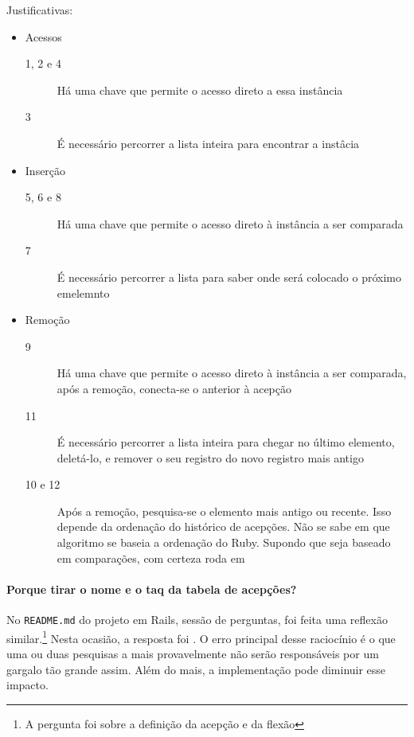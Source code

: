 Justificativas:
\begin{itemize}
    \item Acessos
    \begin{description}
        \item[1, 2 e 4] Há uma chave que permite o acesso direto a essa instância
        \item[3] É necessário percorrer a lista inteira para encontrar a instâcia
    \end{description}
    \item Inserção
    \begin{description}
        \item[5, 6 e 8] Há uma chave que permite o acesso direto à instância a ser comparada
        \item[7] É necessário percorrer a lista para saber onde será colocado o próximo emelemnto
    \end{description}
    \item Remoção
    \begin{description}
        \item[9] Há uma chave que permite o acesso direto à instância a ser comparada, após a remoção,
        conecta-se o anterior à acepção
        \item[11] É necessário percorrer a lista inteira para chegar no último elemento, deletá-lo, e
        remover o seu registro do novo registro mais antigo
        \item[10 e 12] Após a remoção, pesquisa-se o elemento mais antigo ou recente. Isso depende da ordenação
        do histórico de acepções. Não se sabe em que algoritmo se baseia a ordenação do Ruby. Supondo que
        seja baseado em comparações, com certeza roda em 
    \end{description}
\end{itemize}

\paragraph{Porque tirar o nome e o taq da tabela de acepções?}

No \texttt{README.md} do projeto em Rails, sessão de perguntas, foi feita uma reflexão similar.\footnote{A
pergunta foi sobre a definição da acepção e da flexão} Nesta ocasião, a resposta foi . O erro principal desse raciocínio é o que uma ou duas pesquisas a mais provavelmente
não serão responsáveis por um gargalo tão grande assim. Além do mais, a implementação pode diminuir esse impacto.


